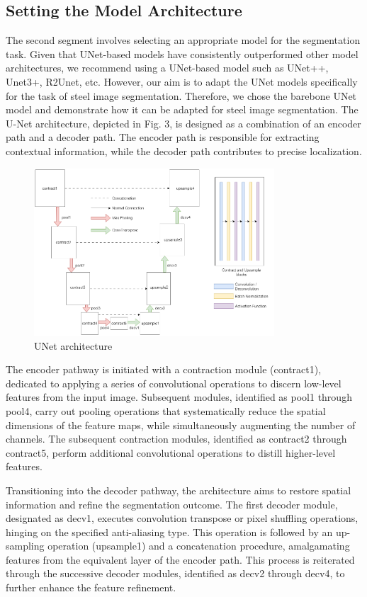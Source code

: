 \documentclass[]{article}
\begin{document}
\subsection{Setting the Model Architecture}

The second segment involves selecting an appropriate model for the segmentation task. Given that UNet-based models have consistently outperformed other model architectures, we recommend using a UNet-based model such as UNet++, Unet3+, R2Unet, etc. However, our aim is to adapt the UNet models specifically for the task of steel image segmentation. Therefore, we chose the barebone UNet model and demonstrate how it can be adapted for steel image segmentation. The U-Net architecture, depicted in Fig. 3, is designed as a combination of an encoder path and a decoder path. The encoder path is responsible for extracting contextual information, while the decoder path contributes to precise localization.


\begin{figure}[ht]
	\centering
	\includegraphics[width=0.8\textwidth]{images/model_updated.png}
	\caption{UNet architecture}
	\label{fig:imageModel}
\end{figure}


The encoder pathway is initiated with a contraction module (contract1), dedicated to applying a series of convolutional operations to discern low-level features from the input image. Subsequent modules, identified as pool1 through pool4, carry out pooling operations that systematically reduce the spatial dimensions of the feature maps, while simultaneously augmenting the number of channels. The subsequent contraction modules, identified as contract2 through contract5, perform additional convolutional operations to distill higher-level features.

Transitioning into the decoder pathway, the architecture aims to restore spatial information and refine the segmentation outcome. The first decoder module, designated as decv1, executes convolution transpose or pixel shuffling operations, hinging on the specified anti-aliasing type. This operation is followed by an up-sampling operation (upsample1) and a concatenation procedure, amalgamating features from the equivalent layer of the encoder path. This process is reiterated through the successive decoder modules, identified as decv2 through decv4, to further enhance the feature refinement.
\end{document}
